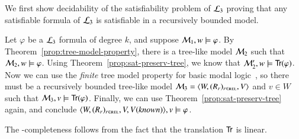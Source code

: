 \begin{pf}
We first show decidability of the satisfiability problem of
$\mathcal{L}_3$ proving that any satisfiable formula of $\mathcal{L}_3$ is
satisfiable in a recursively bounded model.

Let $\varphi$ be a $\mathcal{L}_3$ formula of degree $k$, and suppose
$\mathcal{M}_1,w \models \varphi$. By
Theorem~\ref{prop:tree-model-property}, there is a tree-like model
$\mathcal{M}_2$ such that $\mathcal{M}_2,w \models \varphi$. Using
Theorem~\ref{prop:sat-preserv-tree}, we know that $\mathcal{M}_2',w \models
{\sf Tr}(\varphi)$. Now we can use the \emph{finite} tree model property
for basic modal logic~\cite{BRV01}, so there must be a recursively
bounded tree-like model $\mathcal{M}_3=\langle W,(R_r)_{r \in \textsc{rel}},V \rangle$ and $v \in W$ such
that $\mathcal{M}_3,v \models {\sf Tr}(\varphi)$. Finally, we can use
Theorem~\ref{prop:sat-preserv-tree} again, and conclude
$\langle W,(R_r)_{r \in \textsc{rel}},V,V(\mathit{known}) \rangle,v \models \varphi$.
%

The \pspace-completeness follows from the fact that the translation
${\sf Tr}$ is linear.
\end{pf}




